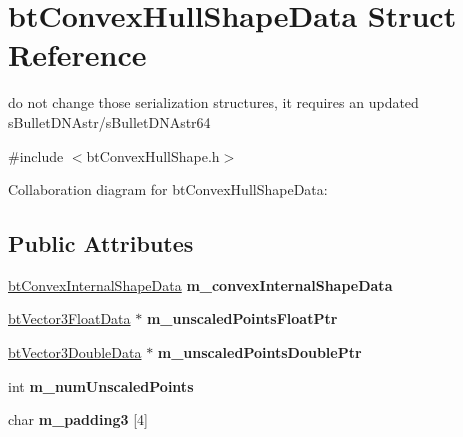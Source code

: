 \hypertarget{structbt_convex_hull_shape_data}{\section{bt\+Convex\+Hull\+Shape\+Data Struct Reference}
\label{structbt_convex_hull_shape_data}
}


do not change those serialization structures, it requires an updated s\+Bullet\+D\+N\+Astr/s\+Bullet\+D\+N\+Astr64  




{\ttfamily \#include $<$bt\+Convex\+Hull\+Shape.\+h$>$}



Collaboration diagram for bt\+Convex\+Hull\+Shape\+Data\+:
\subsection*{Public Attributes}
\begin{DoxyCompactItemize}
\item 
\hypertarget{structbt_convex_hull_shape_data_a643d3c12db61606e5238270a2547e06b}{\hyperlink{structbt_convex_internal_shape_data}{bt\+Convex\+Internal\+Shape\+Data} {\bfseries m\+\_\+convex\+Internal\+Shape\+Data}}\label{structbt_convex_hull_shape_data_a643d3c12db61606e5238270a2547e06b}

\item 
\hypertarget{structbt_convex_hull_shape_data_a63aa9c06b833ca0c205f10dcb269e62c}{\hyperlink{structbt_vector3_float_data}{bt\+Vector3\+Float\+Data} $\ast$ {\bfseries m\+\_\+unscaled\+Points\+Float\+Ptr}}\label{structbt_convex_hull_shape_data_a63aa9c06b833ca0c205f10dcb269e62c}

\item 
\hypertarget{structbt_convex_hull_shape_data_a51708f6f6fa6f7c464ff950b178b2a78}{\hyperlink{structbt_vector3_double_data}{bt\+Vector3\+Double\+Data} $\ast$ {\bfseries m\+\_\+unscaled\+Points\+Double\+Ptr}}\label{structbt_convex_hull_shape_data_a51708f6f6fa6f7c464ff950b178b2a78}

\item 
\hypertarget{structbt_convex_hull_shape_data_af34acdf265280b28caf5f86cea62e01c}{int {\bfseries m\+\_\+num\+Unscaled\+Points}}\label{structbt_convex_hull_shape_data_af34acdf265280b28caf5f86cea62e01c}

\item 
\hypertarget{structbt_convex_hull_shape_data_a7eee19f33d10985ee950693717481801}{char {\bfseries m\+\_\+padding3} \mbox{[}4\mbox{]}}\label{structbt_convex_hull_shape_data_a7eee19f33d10985ee950693717481801}

\end{DoxyCompactItemize}


